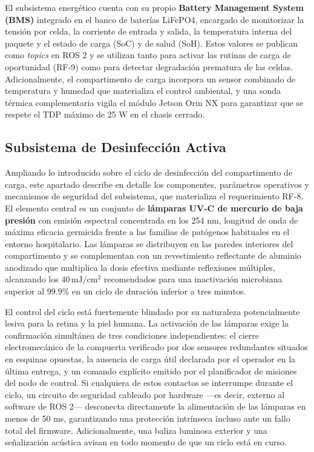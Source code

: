 El subsistema energético cuenta con su propio \textbf{Battery Management System (BMS)} integrado en el banco de baterías LiFePO4, encargado de monitorizar la tensión por celda, la corriente de entrada y salida, la temperatura interna del paquete y el estado de carga (SoC) y de salud (SoH). Estos valores se publican como \textit{topics} en ROS 2 y se utilizan tanto para activar las rutinas de carga de oportunidad (RF-9) como para detectar degradación prematura de las celdas. Adicionalmente, el compartimento de carga incorpora un sensor combinado de temperatura y humedad que materializa el control ambiental, y una sonda térmica complementaria vigila el módulo Jetson Orin NX para garantizar que se respete el TDP máximo de 25 W en el chasis cerrado.

\subsection*{Subsistema de Desinfección Activa}
Ampliando lo introducido sobre el ciclo de desinfección del compartimento de carga, este apartado describe en detalle los componentes, parámetros operativos y mecanismos de seguridad del subsistema, que materializa el requerimiento RF-8. El elemento central es un conjunto de \textbf{lámparas UV-C de mercurio de baja presión} con emisión espectral concentrada en los 254 nm, longitud de onda de máxima eficacia germicida frente a las familias de patógenos habituales en el entorno hospitalario. Las lámparas se distribuyen en las paredes interiores del compartimento y se complementan con un revestimiento reflectante de aluminio anodizado que multiplica la dosis efectiva mediante reflexiones múltiples, alcanzando los $40\,\text{mJ}/\text{cm}^2$ recomendados para una inactivación microbiana superior al 99.9\% en un ciclo de duración inferior a tres minutos.

El control del ciclo está fuertemente blindado por su naturaleza potencialmente lesiva para la retina y la piel humana. La activación de las lámparas exige la confirmación simultánea de tres condiciones independientes: el cierre electromecánico de la compuerta verificado por dos sensores redundantes situados en esquinas opuestas, la ausencia de carga útil declarada por el operador en la última entrega, y un comando explícito emitido por el planificador de misiones del nodo de control. Si cualquiera de estos contactos se interrumpe durante el ciclo, un circuito de seguridad cableado por hardware ---es decir, externo al software de ROS 2--- desconecta directamente la alimentación de las lámparas en menos de 50 ms, garantizando una protección intrínseca incluso ante un fallo total del firmware. Adicionalmente, una baliza luminosa exterior y una señalización acústica avisan en todo momento de que un ciclo está en curso.

